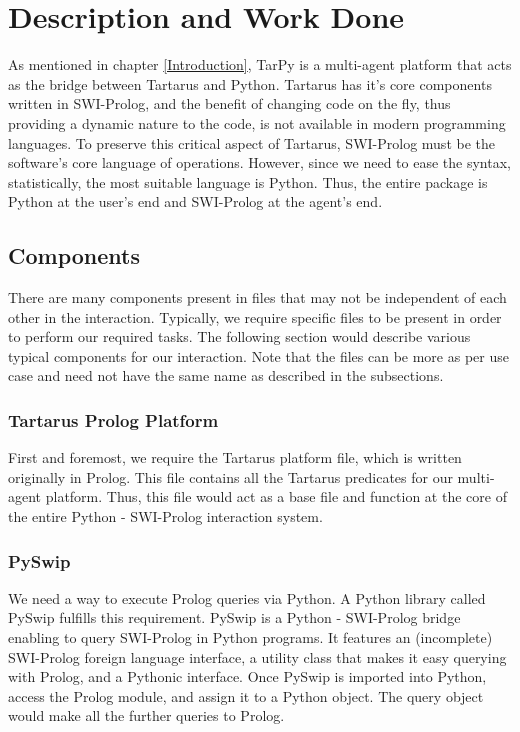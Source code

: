 \chapter{Description and Work Done}

As mentioned in chapter \ref{Introduction}, TarPy is a multi-agent platform that acts as the bridge between Tartarus and Python. Tartarus has it's core components written in SWI-Prolog, and the benefit of changing code on the fly, thus providing a dynamic nature to the code, is not available in modern programming languages. To preserve this critical aspect of Tartarus, SWI-Prolog must be the software's core language of operations. However, since we need to ease the syntax, statistically, the most suitable language is Python. Thus, the entire package is Python at the user's end and SWI-Prolog at the agent's end.

\section{Components}
There are many components present in files that may not be independent of each other in the interaction. Typically, we require specific files to be present in order to perform our required tasks. The following section would describe various typical components for our interaction. Note that the files can be more as per use case and need not have the same name as described in the subsections.

\subsection{Tartarus Prolog Platform}
First and foremost, we require the Tartarus platform file, which is written originally in Prolog. This file contains all the Tartarus predicates for our multi-agent platform. Thus, this file would act as a base file and function at the core of the entire Python - SWI-Prolog interaction system.

\subsection{PySwip}
 We need a way to execute Prolog queries via Python. A Python library called PySwip fulfills this requirement. PySwip is a Python - SWI-Prolog bridge enabling to query SWI-Prolog in Python programs. It features an (incomplete) SWI-Prolog foreign language interface, a utility class that makes it easy querying with Prolog, and a Pythonic interface. Once PySwip is imported into Python, access the Prolog module, and assign it to a Python object. The query object would make all the further queries to Prolog.

